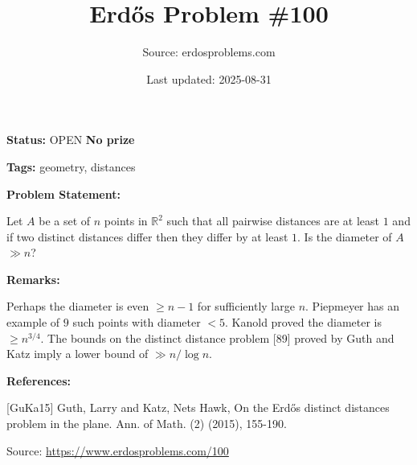 \documentclass{article}
\title{Erd\H{o}s Problem \#100}
\date{Last updated: 2025-08-31}
\author{Source: erdosproblems.com}
\begin{document}
\maketitle

\noindent\textbf{Status:} OPEN \quad \textbf{No prize}

\noindent\textbf{Tags:} geometry, distances

\medskip
\noindent\textbf{Problem Statement:}

Let $A$ be a set of $n$ points in $\mathbb{R}^2$ such that all pairwise distances are at least $1$ and if two distinct distances differ then they differ by at least $1$. Is the diameter of $A$ $\gg n$?

\bigskip
\noindent\textbf{Remarks:}

Perhaps the diameter is even $\geq n-1$ for sufficiently large $n$. Piepmeyer has an example of $9$ such points with diameter $<5$. Kanold proved the diameter is $\geq n^{3/4}$. The bounds on the distinct distance problem [89] proved by Guth and Katz \cite{GuKa15} imply a lower bound of $\gg n/\log n$.

\bigskip
\noindent\textbf{References:}

[GuKa15] Guth, Larry and Katz, Nets Hawk, On the Erd\H{o}s distinct distances problem in the plane. Ann. of Math. (2) (2015), 155-190.

\bigskip
\noindent\small{Source: \url{https://www.erdosproblems.com/100}}
\end{document}
